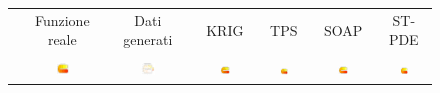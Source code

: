 \documentclass[a4paper,11pt,twoside,openright]{book}							%
\begin{document}
\begin{landscape}
\begin{figure}
\centering
\begin{tabular}{lcccccc}
& Funzione reale & Dati generati & KRIG & TPS & SOAP & ST-PDE \\
&&&&&&\\
\parbox[t]{2mm}{}&\includegraphics[trim=0cm 0cm 0cm 1.8cm,clip=true,width=0.19\textwidth,valign=t]{Immagini/simulazioni/REALEtempo1.png} &
\includegraphics[trim=0.8cm 0.8cm 2.5cm 1.2cm,clip=true,width=0.19\textwidth,valign=t]{immagini/simulazioni/Dati_tempo1.png}&
\includegraphics[trim=0cm 0cm 0cm 1.8cm,clip=true,width=0.19\textwidth,valign=t]{Immagini/simulazioni/KRIGtempo1.png}&
\includegraphics[trim=0cm 0cm 0cm 1.8cm,clip=true,width=0.19\textwidth,valign=t]{Immagini/simulazioni/TPStempo1.png}&
\includegraphics[trim=0cm 0cm 0cm 1.8cm,clip=true,width=0.19\textwidth,valign=t]{Immagini/simulazioni/SOAPtempo1.png}&
\includegraphics[trim=0cm 0cm 0cm 1.8cm,clip=true,width=0.19\textwidth,valign=t]{Immagini/simulazioni/STSRtempo1.png}\\

\end{tabular}
\end{figure}
\end{landscape}
\end{document}
